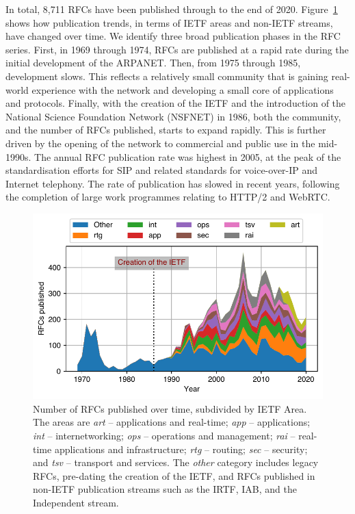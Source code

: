 \documentclass[twocolumn,10pt]{article}
\newlength{\figureWidthOneColumn}
\newcommand{\pb}[1]{\vspace{0.75ex}\noindent{\textbf{#1}}}
\begin{document}

\pb{RFC Publication Rate:}
In total, 8,711 RFCs have been published through to the end of 2020.
Figure~\ref{fig:rfcs_by_area} shows how publication trends, in terms of
IETF areas and non-IETF streams, have changed over time. We identify three
broad publication phases in the RFC series. First, in 1969 through 1974,
RFCs are published at a rapid rate during the initial development of the
ARPANET. Then, from 1975 through 1985, development slows. This reflects a
relatively small community that is gaining real-world experience with the
network and developing a small core of applications and protocols. Finally,
with the creation of the IETF and the introduction of the National Science
Foundation Network (NSFNET) in 1986, both the community, and the number of
RFCs published, starts to expand rapidly. This is further driven by the
opening of the network to commercial and public use in the mid-1990s.
The annual RFC publication rate was highest in 2005, at the peak
of the standardisation efforts for SIP and related standards for voice-over-IP
and Internet telephony. The rate of publication has slowed in recent years,
following the completion of large work programmes relating to HTTP/2 and
WebRTC.

\begin{figure}
  \centering
  \includegraphics[width=\figureWidthOneColumn]{figures-prev/imc-2021/documents/rfcs_areas.pdf}
  \caption{
    Number of RFCs published over time, subdivided by IETF Area.
    The areas are 
    \emph{art} -- applications and real-time;
    \emph{app} -- applications;
    \emph{int} -- internetworking;
    \emph{ops} -- operations and management;
    \emph{rai} -- real-time applications and infrastructure;
    \emph{rtg} -- routing;
    \emph{sec} -- security; and
    \emph{tsv} -- transport and services.
    The \emph{other} category includes legacy RFCs, pre-dating the creation
    of the IETF, and RFCs published in non-IETF publication streams such as
    the IRTF, IAB, and the Independent stream.
  }
  \label{fig:rfcs_by_area}
\end{figure}
\end{document}
